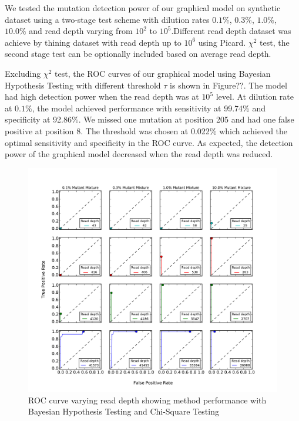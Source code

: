 \documentclass[11pt,reqno]{amsart}
\begin{document}
We tested the mutation detection power of our graphical model on synthetic dataset using a two-stage test scheme with dilution rates $0.1\%$, $0.3\%$, $1.0\%$, $10.0\%$ and read depth varying from $10^2$ to $10^5$.Different read depth dataset was achieve by thining dataset with read depth up to $10^6$ using Picard. $\chi^2$ test, the second stage test can be optionally included based on average read depth.

Excluding $\chi^2$ test, the ROC curves of our graphical model using Bayesian Hypothesis Testing with different threshold $\tau$ is shown in Figure??. The model had high detection power when the read depth was at $10^5$ level. At dilution rate at $0.1\%$, the model achieved performance with sensitivity at 99.74\% and specificity at 92.86\%. We missed one mutation at position 205 and had one false positive at position 8. The threshold was chosen at 0.022\% which achieved the optimal sensitivity and specificity in the ROC curve. As expected, the detection power of the graphical model decreased when the read depth was reduced. 

\begin{figure}[h] %
\begin{center}
\includegraphics[width=160mm]{pdf_figs/ROC_subplots_with_chi2.pdf}
\caption{ROC curve varying read depth showing method performance with Bayesian Hypothesis Testing and Chi-Square Testing}
\label{fig:R}
\end{center}
\end{figure}
\end{document}
